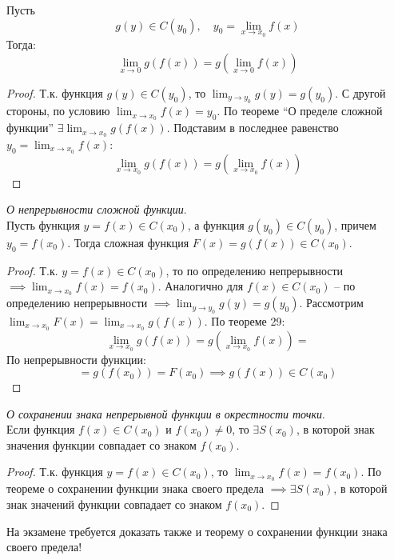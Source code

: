 \begin{theorem}
  Пусть \[
    g(y) \in C(y_0), \quad y_0 = \lim_{x \to x_0} f(x)
  \]
  Тогда: \[
    \lim_{x \to 0} g(f(x)) = g(\lim_{x \to 0} f(x))
  \]
\end{theorem}
\begin{proof}
  Т.к. функция $g\left( y \right) \in C(y_0)$, то $\lim_{y \to y_0} g(y) = g(y_0)$.
  С другой стороны, по условию $\lim_{x \to x_0} f(x) = y_0$.
  По теореме ``О пределе сложной функции'' $\exists \lim_{x \to x_0} g(f(x))$.
  Подставим в последнее равенство $y_0 = \lim_{x \to x_0} f(x)$: \[
    \lim_{x \to x_0} g(f(x)) = g(\lim_{x \to x_0} f(x))
  \]  
\end{proof}

\begin{theorem}
 \textit{О непрерывности сложной функции}. \\
  Пусть функция $y = f(x) \in C(x_0)$, а функция $g(y_0) \in C(y_0)$, причем $y_0 = f(x_0)$.
  Тогда сложная функция $F(x) = g(f(x)) \in C(x_0)$.
\end{theorem}
\begin{proof}
  Т.к. $y = f(x) \in C(x_0)$, то по определению непрерывности $\implies \lim_{x \to x_0} f(x) = f(x_0)$. 
  Аналогично для $f(x) \in C(x_0)$ -- по определению непрерывности $\implies \lim_{y \to y_0} g(y) = g(y_0)$. 
  Рассмотрим $\lim_{x \to x_0} F(x) = \lim_{x \to x_0} g(f(x))$.
  По теореме 29: \[
    \lim_{x \to x_0} g(f(x)) = g(\lim_{x \to x_0} f(x)) = 
  \] 
  По непрерывности функции: \[
    = g(f(x_0)) = F(x_0) \implies g(f(x)) \in C(x_0)
  \] 
\end{proof}

\begin{theorem}
  \textit{О сохранении знака непрерывной функции в окрестности точки}. \\
  Если функция $f(x) \in C(x_0)$ и $f(x_0) \neq 0$, то $\exists S(x_0)$, в которой знак значения функции совпадает со знаком $f(x_0)$.
\end{theorem}
\begin{proof}
  Т.к. функция $y = f(x) \in C(x_0)$, то $\lim_{x \to x_0} f(x) = f(x_0)$. 
  По теореме о сохранении функции знака своего предела $\implies \exists S(x_0)$, в которой знак значений функции совпадает со знаком $f(x_0)$.
\end{proof}
\begin{note}
  На экзамене требуется доказать также и теорему о сохранении функции знака своего предела!
\end{note}

